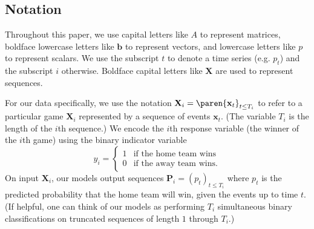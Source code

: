 \subsection{Notation}

Throughout this paper, we use capital letters like $A$ to represent matrices, boldface lowercase letters like $\mathbf b$ to represent vectors, and lowercase letters like $p$ to represent scalars. We use the subscript $t$ to denote a time series (e.g. $p_t$) and the subscript $i$ otherwise. Boldface capital letters like $\mathbf X$ are used to represent sequences.

For our data specifically, we use the notation $\mathbf X_i = \paren{\mathbf x_t}_{t \leq T_i}$ to refer to a particular game $\mathbf X_i$ represented by a sequence of events $\mathbf x_t$. (The variable $T_i$ is the length of the $i$th sequence.) We encode the $i$th response variable (the winner of the $i$th game) using the binary indicator variable
\begin{equation}
	y_i = \begin{cases}
		1 & \text{if the home team wins}  \\
		0 & \text{if the away team wins}.
	\end{cases}
\end{equation}
On input $\mathbf X_i$, our models output sequences $\mathbf P_i = (p_t)_{t \leq T_i}$ where $p_t$ is the predicted probability that the home team will win, given the events up to time $t$. (If helpful, one can think of our models as performing $T_i$ simultaneous binary classifications on truncated sequences of length $1$ through $T_i$.)

